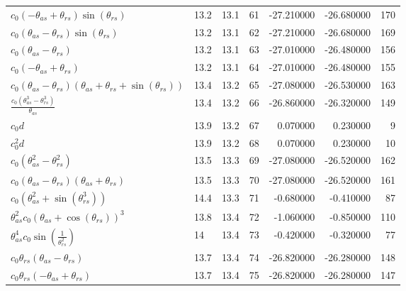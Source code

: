 \begin{tabularx}{\textwidth}{lllrrrr}
$ c_{0} \left(- \theta_{as} + \theta_{rs}\right) \sin{\left(\theta_{rs} \right)} $  &  13.2  &  13.1  &  61  &  -27.210000  &  -26.680000  &  170  \\ 
$ c_{0} \left(\theta_{as} - \theta_{rs}\right) \sin{\left(\theta_{rs} \right)} $  &  13.2  &  13.1  &  62  &  -27.210000  &  -26.680000  &  169  \\ 
$ c_{0} \left(\theta_{as} - \theta_{rs}\right) $  &  13.2  &  13.1  &  63  &  -27.010000  &  -26.480000  &  156  \\ 
$ c_{0} \left(- \theta_{as} + \theta_{rs}\right) $  &  13.2  &  13.1  &  64  &  -27.010000  &  -26.480000  &  155  \\ 
$ c_{0} \left(\theta_{as} - \theta_{rs}\right) \left(\theta_{as} + \theta_{rs} + \sin{\left(\theta_{rs} \right)}\right) $  &  13.4  &  13.2  &  65  &  -27.080000  &  -26.530000  &  163  \\ 
$ \displaystyle\frac{c_{0} \left(\theta_{as}^{3} - \theta_{rs}^{3}\right)}{\theta_{as}} $  &  13.4  &  13.2  &  66  &  -26.860000  &  -26.320000  &  149  \\ 
$ c_{0} d $  &  13.9  &  13.2  &  67  &  0.070000  &  0.230000  &  9  \\ 
$ c_{0}^{2} d $  &  13.9  &  13.2  &  68  &  0.070000  &  0.230000  &  10  \\ 
$ c_{0} \left(\theta_{as}^{2} - \theta_{rs}^{2}\right) $  &  13.5  &  13.3  &  69  &  -27.080000  &  -26.520000  &  162  \\ 
$ c_{0} \left(\theta_{as} - \theta_{rs}\right) \left(\theta_{as} + \theta_{rs}\right) $  &  13.5  &  13.3  &  70  &  -27.080000  &  -26.520000  &  161  \\ 
$ c_{0} \left(\theta_{as}^{2} + \sin{\left(\theta_{rs}^{3} \right)}\right) $  &  14.4  &  13.3  &  71  &  -0.680000  &  -0.410000  &  87  \\ 
$ \theta_{as}^{2} c_{0} \left(\theta_{as} + \cos{\left(\theta_{rs} \right)}\right)^{3} $  &  13.8  &  13.4  &  72  &  -1.060000  &  -0.850000  &  110  \\ 
$ \theta_{as}^{4} c_{0} \sin{\left(\displaystyle\frac{1}{\theta_{rs}^{2}} \right)} $  &  14\phantom{.0}  &  13.4  &  73  &  -0.420000  &  -0.320000  &  77  \\ 
$ c_{0} \theta_{rs} \left(\theta_{as} - \theta_{rs}\right) $  &  13.7  &  13.4  &  74  &  -26.820000  &  -26.280000  &  148  \\ 
$ c_{0} \theta_{rs} \left(- \theta_{as} + \theta_{rs}\right) $  &  13.7  &  13.4  &  75  &  -26.820000  &  -26.280000  &  147  \\ 

\end{tabularx}
